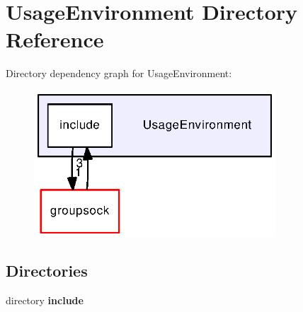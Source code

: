 \section{Usage\+Environment Directory Reference}
\label{dir_7785f6c6a706fda75fe9a579a5a0e44c}
Directory dependency graph for Usage\+Environment\+:
\nopagebreak
\begin{figure}[H]
\begin{center}
\leavevmode
\includegraphics[width=256pt]{dir_7785f6c6a706fda75fe9a579a5a0e44c_dep}
\end{center}
\end{figure}
\subsection*{Directories}
\begin{DoxyCompactItemize}
\item 
directory {\bf include}
\end{DoxyCompactItemize}
